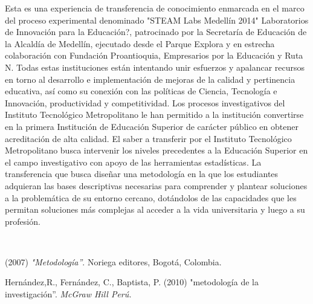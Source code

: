 \begin{titlepage}
\begin{minipage}{0.85\linewidth}
\begin{minipage}{0.85\linewidth}
\begin{resumen}
Esta es una experiencia  de transferencia de conocimiento enmarcada en el marco del proceso experimental denominado "STEAM Labs Medell\'in 2014" Laboratorios de Innovaci\'on para la Educaci\'on?, patrocinado por  la Secretar\'ia de Educaci\'on de la Alcald\'ia de Medell\'in, ejecutado desde el Parque Explora y en estrecha colaboraci\'on con Fundaci\'on Proantioquia, Empresarios por la Educaci\'on y Ruta N. Todas estas instituciones est\'an intentando unir esfuerzos y apalancar recursos en torno al desarrollo e implementaci\'on de mejoras de la calidad y pertinencia educativa, as\'i como su conexi\'on con las pol\'iticas de Ciencia, Tecnolog\'ia e Innovaci\'on, productividad y competitividad. 
Los procesos investigativos del Instituto Tecnol\'ogico Metropolitano le han permitido a la instituci\'on convertirse en la primera Instituci\'on de Educaci\'on Superior de car\'acter p\'ublico en obtener acreditaci\'on de alta calidad. El saber a transferir por el Instituto Tecnol\'ogico Metropolitano busca intervenir los niveles precedentes a la Educaci\'on Superior en el campo investigativo con apoyo de las herramientas estad\'isticas. La transferencia que busca dise\~nar una metodolog\'ia en la que los estudiantes adquieran las bases descriptivas necesarias para comprender y plantear soluciones  a la problem\'atica de su entorno cercano, dot\'andolos de las capacidades que les permitan soluciones m\'as complejas al acceder a la vida universitaria y luego a su profesi\'on. 

    \end{resumen}
\end{minipage}
\vspace*{5pt}\\
\footnotesize
%  
    
\end{minipage}
\vspace{5pt}
\begin{thebibliography}{99}
 (2007) {\it "Metodolog\'ia''}.  Noriega editores, Bogot\'a, Colombia.

 {\sc Hern\'andez,R., Fern\'andez, C., Baptista, P.} (2010) "metodolog\'ia de la investigaci\'on''. \emph{McGraw Hill Per\'u.}
\end{thebibliography}
\end{titlepage}
